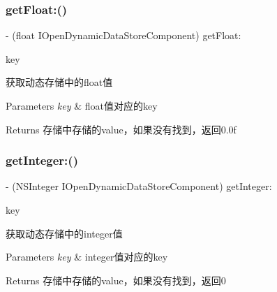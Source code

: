 \subsubsection{\texorpdfstring{get\+Float\+:()}{getFloat:()}}
{\footnotesize\ttfamily -\/ (float I\+Open\+Dynamic\+Data\+Store\+Component) get\+Float\+: \begin{DoxyParamCaption}\item[{(N\+S\+String $\ast$)}]{key }\end{DoxyParamCaption}}

获取动态存储中的float值 
\begin{DoxyParams}{Parameters}
{\em key} & float值对应的key \\
\hline
\end{DoxyParams}
\begin{DoxyReturn}{Returns}
存储中存储的value，如果没有找到，返回0.0f 
\end{DoxyReturn}
\mbox{\label{protocol_i_open_dynamic_data_store_component_01-p_a193d8fc727f9122f7ab03eb8ea1b30b5}} 
\subsubsection{\texorpdfstring{get\+Integer\+:()}{getInteger:()}}
{\footnotesize\ttfamily -\/ (N\+S\+Integer I\+Open\+Dynamic\+Data\+Store\+Component) get\+Integer\+: \begin{DoxyParamCaption}\item[{(N\+S\+String $\ast$)}]{key }\end{DoxyParamCaption}}

获取动态存储中的integer值 
\begin{DoxyParams}{Parameters}
{\em key} & integer值对应的key \\
\hline
\end{DoxyParams}
\begin{DoxyReturn}{Returns}
存储中存储的value，如果没有找到，返回0 
\end{DoxyReturn}
\mbox{\label{protocol_i_open_dynamic_data_store_component_01-p_a62091f319f6fd60a92ad2b4281f88d8e}} 

